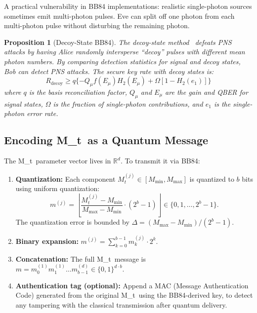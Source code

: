 \documentclass[11pt,a4paper]{article}
\theoremstyle{plain}
\newtheorem{proposition}[theorem]{Proposition}
\theoremstyle{definition}
\theoremstyle{remark}
\newcommand{\R}{\mathbb{R}}
\newcommand{\Mt}{M_t}
\begin{document}
A practical vulnerability in BB84 implementations: realistic single-photon
sources sometimes emit multi-photon pulses. Eve can split off one photon
from each multi-photon pulse without disturbing the remaining photon.

\begin{proposition}[Decoy-State BB84]
\label{prop:decoy}
The decoy-state method~\cite{decoy_state} defeats PNS attacks by having Alice
randomly intersperse ``decoy'' pulses with different mean photon numbers.
By comparing detection statistics for signal and decoy states, Bob can
detect PNS attacks. The secure key rate with decoy states is:
\[
R_{\text{decoy}} \geq q\{-Q_\mu f(E_\mu)H_2(E_\mu) + \Omega[1 - H_2(e_1)]\}
\]
where $q$ is the basis reconciliation factor, $Q_\mu$ and $E_\mu$ are the
gain and QBER for signal states, $\Omega$ is the fraction of single-photon
contributions, and $e_1$ is the single-photon error rate.
\end{proposition}

\subsection{Encoding \Mt\ as a Quantum Message}
\label{sec:bb84_encoding}

The \Mt\ parameter vector lives in $\R^d$. To transmit it via BB84:

\begin{enumerate}[label=(\arabic*)]
  \item \textbf{Quantization:} Each component $M_t^{(j)} \in [M_{\min}, M_{\max}]$
        is quantized to $b$ bits using uniform quantization:
        \[
        m^{(j)} = \left\lfloor
        \frac{M_t^{(j)} - M_{\min}}{M_{\max} - M_{\min}} \cdot (2^b - 1)
        \right\rfloor \in \{0,1,\ldots,2^b-1\}.
        \]
        The quantization error is bounded by
        $\Delta = (M_{\max} - M_{\min}) / (2^b - 1)$.
  
  \item \textbf{Binary expansion:}
        $m^{(j)} = \sum_{k=0}^{b-1} m^{(j)}_k \cdot 2^k$.

  \item \textbf{Concatenation:}
        The full \Mt\ message is $m = m^{(1)}_0 m^{(1)}_1 \ldots m^{(d)}_{b-1} \in \{0,1\}^{d \cdot b}$.

  \item \textbf{Authentication tag (optional):} Append a MAC (Message
        Authentication Code) generated from the original \Mt\ using the
        BB84-derived key, to detect any tampering with the classical
        transmission after quantum delivery.
\end{enumerate}
\end{document}
